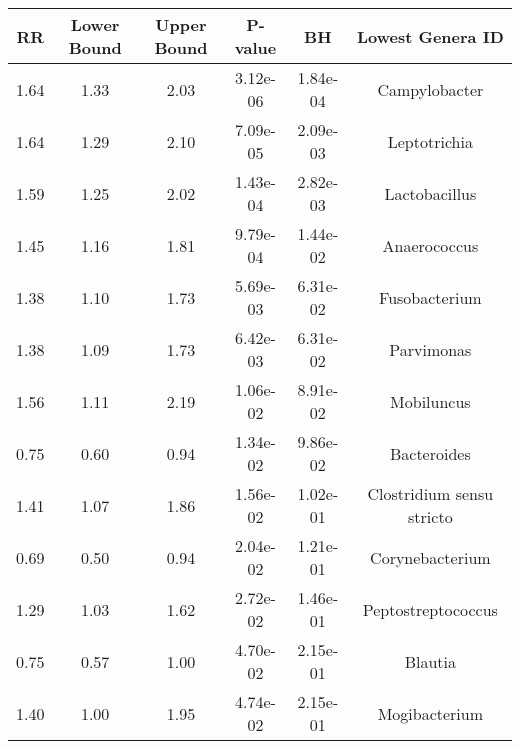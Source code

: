 \documentclass[12pt,]{article}
\begin{document}
\begin{longtable}[]{@{}cccccc@{}}
\toprule
RR & Lower Bound & Upper Bound & P-value & BH & Lowest Genera
ID\tabularnewline
\midrule
\endhead
1.64 & 1.33 & 2.03 & 3.12e-06 & 1.84e-04 & Campylobacter\tabularnewline
1.64 & 1.29 & 2.10 & 7.09e-05 & 2.09e-03 & Leptotrichia\tabularnewline
1.59 & 1.25 & 2.02 & 1.43e-04 & 2.82e-03 & Lactobacillus\tabularnewline
1.45 & 1.16 & 1.81 & 9.79e-04 & 1.44e-02 & Anaerococcus\tabularnewline
1.38 & 1.10 & 1.73 & 5.69e-03 & 6.31e-02 & Fusobacterium\tabularnewline
1.38 & 1.09 & 1.73 & 6.42e-03 & 6.31e-02 & Parvimonas\tabularnewline
1.56 & 1.11 & 2.19 & 1.06e-02 & 8.91e-02 & Mobiluncus\tabularnewline
0.75 & 0.60 & 0.94 & 1.34e-02 & 9.86e-02 & Bacteroides\tabularnewline
1.41 & 1.07 & 1.86 & 1.56e-02 & 1.02e-01 & Clostridium sensu
stricto\tabularnewline
0.69 & 0.50 & 0.94 & 2.04e-02 & 1.21e-01 &
Corynebacterium\tabularnewline
1.29 & 1.03 & 1.62 & 2.72e-02 & 1.46e-01 &
Peptostreptococcus\tabularnewline
0.75 & 0.57 & 1.00 & 4.70e-02 & 2.15e-01 & Blautia\tabularnewline
1.40 & 1.00 & 1.95 & 4.74e-02 & 2.15e-01 & Mogibacterium\tabularnewline
\bottomrule
\end{longtable}
\end{document}
